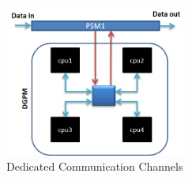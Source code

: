 \begin{figure}[h!]
	\centering
	\includegraphics[width=60mm]{figures/dedicated_channels}
	\caption{Dedicated Communication Channels}
	\label{fig:mm:dedicated_channels}
\end{figure}

